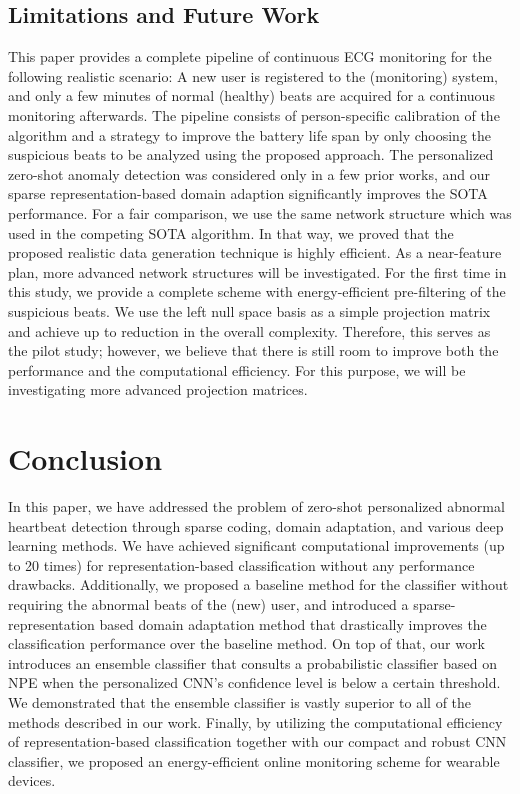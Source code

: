 \documentclass[journal,transmag]{IEEEtran}
\begin{document}
\subsection{Limitations and Future Work}
This paper provides a complete pipeline of continuous ECG monitoring for the following realistic scenario: A new user is registered to the (monitoring) system, and only a few minutes of normal (healthy) beats are acquired for a continuous monitoring afterwards. 
The pipeline consists of person-specific calibration of the algorithm and a strategy to improve the battery life span by only choosing the suspicious beats to be analyzed using the proposed approach. 
The personalized zero-shot anomaly detection was considered only in a few prior works, and our sparse representation-based domain adaption significantly improves the SOTA performance. For a fair comparison, we use the same network structure which was used in the competing SOTA algorithm. In that way, we proved that the proposed realistic data generation technique is highly efficient. As a near-feature plan, more advanced network structures will be investigated.
For the first time in this study, we provide a complete scheme with energy-efficient pre-filtering of the suspicious beats. We use the left null space basis as a simple projection matrix and achieve up to  reduction in the overall complexity.
Therefore, this serves as the pilot study; however, we believe that there is still room to improve both the performance and the computational efficiency. For this purpose, we will be investigating more advanced projection matrices.













\section{Conclusion}
\label{sec:conclusion}
In this paper, we have addressed the problem of zero-shot personalized abnormal heartbeat detection through sparse coding, domain adaptation, and various deep learning methods. 
We have achieved significant computational improvements (up to 20 times) for representation-based classification without any performance drawbacks. Additionally, we proposed a baseline method for the classifier without requiring the abnormal beats of the (new) user, and introduced a sparse-representation based domain adaptation method that drastically improves the classification performance over the baseline method. 
On top of that, our work introduces an ensemble classifier that consults a probabilistic classifier based on NPE when the personalized CNN's confidence level is below a certain threshold. We demonstrated that the ensemble classifier is vastly superior to all of the methods described in our work. Finally, by utilizing the computational efficiency of representation-based classification together with our compact and robust CNN classifier, we proposed an energy-efficient  online monitoring scheme for wearable devices.

\ifCLASSOPTIONcaptionsoff
  \newpage
\fi




\end{document}
